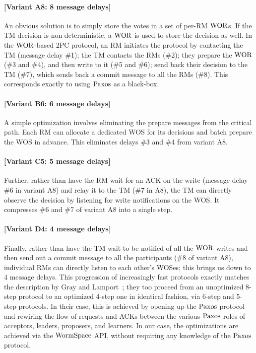 \paragraph{[Variant A8: 8 message delays]} An obvious solution is to simply store the votes in a set of per-RM $\mathrm{WOR}$s. 
If the TM decision is non-deterministic, a $\mathrm{WOR}$ is used to store the decision as well. In the $\mathrm{WOR}$-based 2PC protocol, 
an RM initiates the protocol by contacting the TM (message delay \#1); the TM contacts the RMs (\#2); 
they prepare the $\mathrm{WOR}$ (\#3 and \#4), and then write to it (\#5 and \#6); send back their decision to the TM (\#7), 
which sends back a commit message to all the RMs (\#8). This corresponds exactly to using $\mathrm{Paxos}$ as a black-box.

\paragraph{[Variant B6: 6 message delays]} A simple optimization involves eliminating the prepare messages from the critical path. 
Each RM can allocate a dedicated WOS for its decisions and batch prepare the WOS in advance. 
This eliminates delays \#3 and \#4 from variant A8.%


\paragraph{[Variant C5: 5 message delays]} Further, rather than have the RM wait for an ACK on the write (message delay \#6 in variant A8) and relay it to the TM (\#7 in A8), the TM can directly observe the decision by listening for write notifications on the WOS. 
It compresses \#6 and \#7 of variant A8 into a single step.


\paragraph{[Variant D4: 4 message delays]} Finally, rather than have the TM wait to be notified of all the $\mathrm{WOR}$ 
writes and then send out a commit message to all the participants (\#8 of variant A8), 
individual RMs can directly listen to each other's WOSes; this brings us down to 4 message delays.
This progression of increasingly fast protocols exactly matches the description by Gray and Lamport~\cite{gray:2006}; 
they too proceed from an unoptimized 8-step protocol to an optimized 4-step one in identical fashion, via 6-step and 5-step protocols. 
In their case, this is achieved by opening up the $\mathrm{Paxos}$ protocol and rewiring the flow of requests and ACKs between the various 
$\mathrm{Paxos}$ roles of acceptors, leaders, proposers, and learners. In our case, the optimizations are achieved via the $\mathrm{WormSpace}$ API, 
without requiring any knowledge of the $\mathrm{Paxos}$ protocol.

